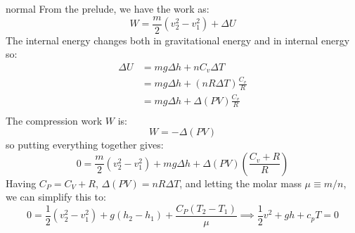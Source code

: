 \begin{solution}{normal}
From the prelude, we have the work as:
$$W = \frac{m}{2}(v_2^2-v_1^2) + \Delta U$$
The internal energy changes both in gravitational energy and in internal energy so:
\begin{align*}
\Delta U &= mg\Delta h + nC_v\Delta T \\
&= mg\Delta h + \left(nR\Delta T\right)\frac{C_v}{R} \\
&= mg\Delta h + \Delta(PV)\frac{C_v}{R} \\
\end{align*}
The compression work $W$ is:
$$W=-\Delta(PV)$$
so putting everything together gives:
$$0=\frac{m}{2}(v_2^2-v_1^2)+mg\Delta h + \Delta(PV) \left(\frac{C_v+R}{R}\right)$$
Having $C_P=C_V+R$, $\Delta(PV)=nR\Delta T$, and letting the molar mass $\mu\equiv m/n$, we can simplify this to: 
$$0=\frac{1}{2}(v_2^2-v_1^2)+g(h_2-h_1) + \frac{C_P(T_2-T_1)}{\mu}\implies \frac{1}{2}v^2 + gh + c_p T = 0$$
\end{solution}